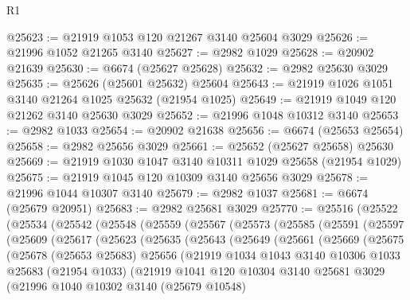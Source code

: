 \begin{lexlean}{R1}
\begin{coremodule}
@25623 := @21919 @1053 @120 @21267 @3140 @25604 @3029
@25626 := @21996 @1052 @21265 @3140
@25627 := @2982 @1029
@25628 := @20902 @21639
@25630 := @6674 (@25627 @25628)
@25632 := @2982 @25630 @3029
@25635 := @25626 (@25601 @25632) @25604
@25643 := @21919 @1026 @1051 @3140 @21264 @1025 @25632 (@21954 @1025)
@25649 := @21919 @1049 @120 @21262 @3140 @25630 @3029
@25652 := @21996 @1048 @10312 @3140
@25653 := @2982 @1033
@25654 := @20902 @21638
@25656 := @6674 (@25653 @25654)
@25658 := @2982 @25656 @3029
@25661 := @25652 (@25627 @25658) @25630
@25669 := @21919 @1030 @1047 @3140 @10311 @1029 @25658 (@21954 @1029)
@25675 := @21919 @1045 @120 @10309 @3140 @25656 @3029
@25678 := @21996 @1044 @10307 @3140
@25679 := @2982 @1037
@25681 := @6674 (@25679 @20951)
@25683 := @2982 @25681 @3029
@25770 := @25516
    (@25522
      (@25534
        (@25542
          (@25548
            (@25559
              (@25567
                (@25573
                  (@25585
                    (@25591
                      (@25597
                        (@25609
                          (@25617
                            (@25623
                              (@25635
                                (@25643
                                  (@25649
                                    (@25661
                                      (@25669
                                        (@25675
                                          (@25678
                                            (@25653 @25683)
                                            @25656
                                            (@21919
                                              @1034
                                              @1043
                                              @3140
                                              @10306
                                              @1033
                                              @25683
                                              (@21954 @1033)
                                              (@21919
                                                @1041
                                                @120
                                                @10304
                                                @3140
                                                @25681
                                                @3029
                                                (@21996
                                                  @1040
                                                  @10302
                                                  @3140
                                                  (@25679 @10548)

\end{coremodule}
\end{lexlean}
